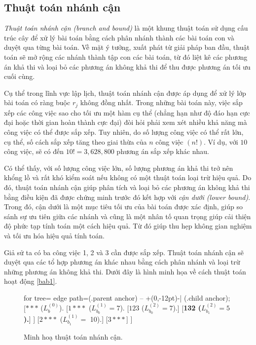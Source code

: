 \subsection*{Thuật toán nhánh cận}
\textit{Thuật toán nhánh cận (branch and bound)} là một khung thuật toán sử dụng cấu trúc cây để xử lý bài toán bằng cách phân nhánh thành các bài toán con và duyệt qua từng bài toán. Về mặt ý tưởng, xuất phát từ giải pháp ban đầu, thuật toán sẽ mở rộng các nhánh thành tập con các bài toán, từ đó liệt kê các phương án khả thi và loại bỏ các phương án không khả thi để thu được phương án tối ưu cuối cùng.

Cụ thể trong lĩnh vực lập lịch, thuật toán nhánh cận được áp dụng để xử lý lớp bài toán có ràng buộc $r_j$ không đồng nhất. Trong những bài toán này, việc sắp xếp các công việc sao cho tối ưu một hàm cụ thể (chẳng hạn như độ đáo hạn cực đại hoặc thời gian hoàn thành cực đại) đòi hỏi phải xem xét nhiều khả năng mà công việc có thể được sắp xếp. Tuy nhiên, do số lượng công việc có thể rất lớn, cụ thể, số cách sắp xếp tăng theo giai thừa của $n$ công việc $(n!)$. Ví dụ, với $10$ công việc, sẽ có đến $10! = 3,628,800$ phương án sắp xếp khác nhau.

Có thể thấy, với số lượng công việc lớn, số lượng phương án khả thi trở nên khổng lồ và rất khó kiểm soát nếu không có một thuật toán loại trừ hiệu quả. Do đó, thuật toán nhánh cận giúp phân tích và loại bỏ các phương án không khả thi bằng điều kiện đã được chứng minh trước đó kết hợp với \textit{cận dưới (lower bound)}. Trong đó, cận dưới là một mục tiêu tối ưu của bài toán được xác định, giúp so sánh sự ưu tiên giữa các nhánh và cũng là một nhân tố quan trọng giúp cải thiện độ phức tạp tính toán một cách hiệu quả. Từ đó giúp thu hẹp không gian nghiệm và tối ưu hóa hiệu quả tính toán.


Giả sử ta có ba công việc 1, 2 và 3 cần được sắp xếp. Thuật toán nhánh cận sẽ duyệt qua các tổ hợp phương án khác nhau bằng cách phân nhánh và loại trừ những phương án không khả thi. Dưới đây là hình minh họa về cách thuật toán hoạt động \eqref{bab1}.

\begin{figure}[h!]
	\centering
	\begin{forest} for tree={
		edge path={\noexpand{} (.parent anchor) -- +(0,-12pt)-| (.child anchor);}
	}
	[{$***$ ($L_b^{(0)}$).}
		[{$1***$ ($L_{b_0}^{(1)}=7$).}
			[{$123$ ($L_{b_0}^{(2)} =7$).}]
			[{\textbf{132 ($L_{b_1}^{(2)} =5$).}}]
		]
		[{$2***$ ($L_{b_1}^{(1)} =$ 10).}]
		[$3***$]
	]
	\end{forest}
\caption{\label{bab1}Minh hoạ thuật toán nhánh cận.}
\end{figure}


